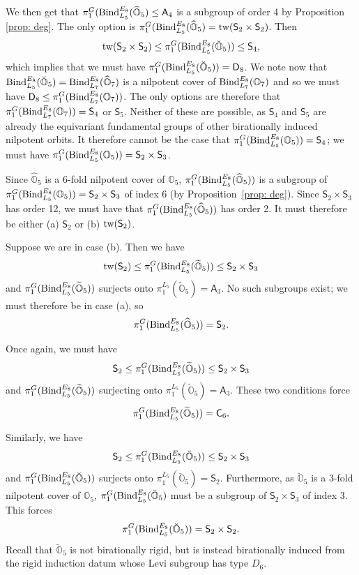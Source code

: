 \documentclass[11pt]{amsart}
\renewcommand{\O}{{\mathbb O}}
\newcommand{\Dih}{{\mathsf{D}}}
\newcommand{\Alt}{{\mathsf{A}}}
\newcommand{\Sym}{{\mathsf{S}}}
\newcommand{\Cyc}{{\mathsf{C}}}
\newcommand{\tw}{{{\mbox{\rm tw}}}}
\newcommand{\BInd}{{{\mbox{\rm Bind}}}}
\newcommand{\covO}{\widetilde{\O}}
\newcommand{\hatO}{\widehat{\O}}
\newcommand{\breveO}{\breve{\O}}
\numberwithin{equation}{section}
\begin{document}
	We then get that $\pi_1^G(\BInd_{L_5}^{E_8}(\hatO_5)\leq \Alt_4$ is a subgroup of order 4 by Proposition \ref{prop: deg}. The only option is $\pi_1^G(\BInd_{L_5}^{E_8}(\hatO_5)=\tw(\Sym_2\times \Sym_2)$. Then $$\tw(\Sym_2\times \Sym_2)\leq \pi_1^G(\BInd_{L_5}^{E_8}(\breveO_5))\leq \Sym_4,$$ which implies that we must have $\pi_1^G(\BInd_{L_5}^{E_8}(\breveO_5))=\Dih_8$. We note now that $\BInd_{L_5}^{E_8}(\breveO_5)=\BInd_{L_7}^{E_8}(\hatO_7)$ is a nilpotent cover of $\BInd_{L_7}^{E_8}(\O_7)$ and so we must have $\Dih_8\leq \pi_1^G(\BInd_{L_7}^{E_8}(\O_7))$. The only options are therefore that $\pi_1^G(\BInd_{L_7}^{E_8}(\O_7))=\Sym_4$ or $\Sym_5$. Neither of these are possible, as $\Sym_4$ and $\Sym_5$ are already the equivariant fundamental groups of other birationally induced nilpotent orbits. It therefore cannot be the case that $\pi_1^G(\BInd_{L_5}^{E_8}(\O_5))=\Sym_4$; we must have $\pi_1^G(\BInd_{L_5}^{E_8}(\O_5))=\Sym_2\times \Sym_3$.
	
	Since $\hatO_5$ is a 6-fold nilpotent cover of $\O_5$, $\pi_1^{G}(\BInd_{L_5}^{E_8}(\hatO_5))$ is a subgroup of $\pi_1^{G}(\BInd_{L_5}^{E_8}(\O_5))=\Sym_2\times \Sym_3$ of index 6 (by Proposition~\ref{prop: deg}). Since $\Sym_2\times \Sym_3$ has order 12, we must have that $\pi_1^G(\BInd_{L_5}^{E_8}(\hatO_5))$ has order 2. It must therefore be either (a) $\Sym_2$ or (b) $\tw(\Sym_2)$.
	
	Suppose we are in case (b). Then we have $$\tw(\Sym_2) \leq \pi_1^{G}(\BInd_{L_5}^{E_8}(\covO_5))\leq \Sym_2\times \Sym_3$$ and $\pi_1^G(\BInd_{L_5}^{E_8}(\covO_5))$ surjects onto $\pi_1^{L_5}(\covO_5)=\Alt_3$. No such subgroups exist; we must therefore be in case (a), so 
	$$\pi_1^G(\BInd_{L_5}^{E_8}(\hatO_5))=\Sym_2.$$
	
	Once again, we must have $$\Sym_2 \leq \pi_1^G(\BInd_{L_5}^{E_8}(\covO_5))\leq \Sym_2\times \Sym_3$$ and $\pi_1^G(\BInd_{L_5}^{E_8}(\covO_5))$ surjecting onto $\pi_1^{L_5}(\covO_5)=\Alt_3$. These two conditions force $$\pi_1^G(\BInd_{L_5}^{E_8}(\covO_5))=\Cyc_6.$$
	
	Similarly, we have $$\Sym_2 \leq \pi_1^G(\BInd_{L_5}^{E_8}(\breveO_5))\leq \Sym_2\times \Sym_3$$ and $\pi_1^G(\BInd_{L_5}^{E_8}(\breveO_5))$ surjects onto $\pi_1^{L_5}(\breveO_5)=\Sym_2$. Furthermore, as $\breveO_5$ is a 3-fold nilpotent cover of $\O_5$, $\pi_1^G(\BInd_{L_5}^{E_8}(\breveO_5)$ must be a subgroup of $\Sym_2\times \Sym_3$ of index 3. This forces 
	$$\pi_1^G(\BInd_{L_5}^{E_8}(\breveO_5))=\Sym_2\times \Sym_2.$$ Recall that $\breveO_5$ is not birationally rigid, but is instead birationally induced from the rigid induction datum whose Levi subgroup has type $D_6$.
	
\end{document}
